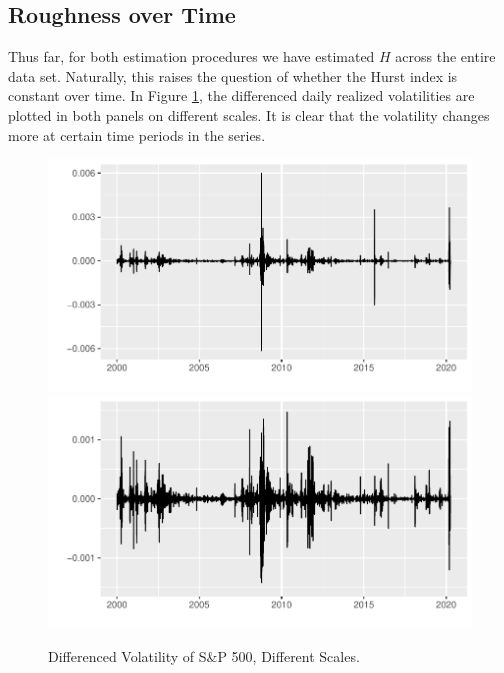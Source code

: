 \subsection{Roughness over Time}
Thus far, for both estimation procedures we have estimated $H$ across the entire data set. Naturally, this raises the question of whether the Hurst index is constant over time. In Figure \ref{fig:diff_plot}, the differenced daily realized volatilities are plotted in both panels on different scales. It is clear that the volatility changes more at certain time periods in the series.
\begin{figure}[H]
    \centering
    \includegraphics[scale=0.5]{fig/img/RealizedLib/diff_plot.pdf}
    \includegraphics[scale=0.5]{fig/img/RealizedLib/diff_plot2.pdf}
    \caption{Differenced Volatility of S\&P 500, Different Scales.}
    \label{fig:diff_plot}
\end{figure}

